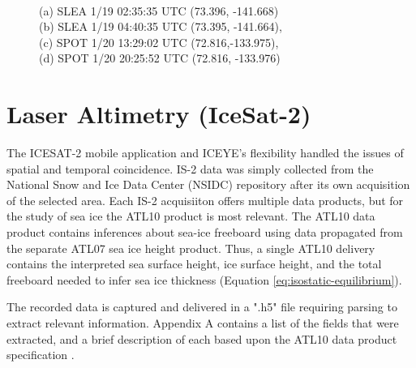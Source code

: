 \begin{figure}[h!]
    \centering
    \caption[ICEYE Captured SAR Imagery]{
    \\\hspace{\textwidth}
    (a) SLEA 1/19 02:35:35 UTC (73.396, -141.668)\\\hspace{\textwidth}
     (b) SLEA 1/19 04:40:35 UTC (73.395, -141.664),\\\hspace{\textwidth}
      (c) SPOT 1/20 13:29:02 UTC (72.816,-133.975),\\\hspace{\textwidth}
      (d) SPOT 1/20 20:25:52 UTC (72.816, -133.976)
      }
    \label{fig:gathered-sar}

\end{figure}

\section {Laser Altimetry (IceSat-2)}
The ICESAT-2 mobile application and ICEYE's flexibility handled the issues of spatial and temporal coincidence. IS-2 data was simply collected from the National Snow and Ice Data Center (NSIDC) repository after its own acquisition of the selected area. Each IS-2 acquisiiton offers multiple data products, but for the study of sea ice the ATL10 product is most relevant. The ATL10 data product contains inferences about sea-ice freeboard using data propagated from the separate ATL07 sea ice height product. Thus, a single ATL10 delivery contains the interpreted sea surface height, ice surface height, and the total freeboard \cite{ICESat-2-ATL10-Product} needed to infer sea ice thickness (Equation \ref{eq:isostatic-equilibrium}).

The recorded data is captured and delivered in a ".h5" file requiring parsing to extract relevant information. Appendix A contains a list of the fields that were extracted, and a brief description of each based upon the ATL10 data product specification \cite*{ICESat-2-ATL10-Product}.

